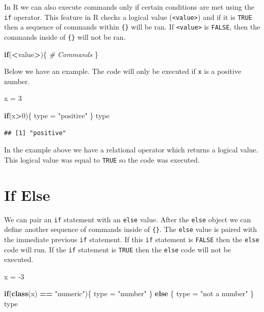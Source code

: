 \documentclass[
]{book}
\newenvironment{Shaded}{\begin{snugshade}}{\end{snugshade}}
\newcommand{\CommentTok}[1]{\textcolor[rgb]{0.56,0.35,0.01}{\textit{#1}}}
\newcommand{\ControlFlowTok}[1]{\textcolor[rgb]{0.13,0.29,0.53}{\textbf{#1}}}
\newcommand{\DecValTok}[1]{\textcolor[rgb]{0.00,0.00,0.81}{#1}}
\newcommand{\KeywordTok}[1]{\textcolor[rgb]{0.13,0.29,0.53}{\textbf{#1}}}
\newcommand{\NormalTok}[1]{#1}
\newcommand{\OperatorTok}[1]{\textcolor[rgb]{0.81,0.36,0.00}{\textbf{#1}}}
\newcommand{\StringTok}[1]{\textcolor[rgb]{0.31,0.60,0.02}{#1}}
\begin{document}
In R we can also execute commands only if certain conditions are met using the \texttt{if} operator. This feature in R checks a logical value (\texttt{\textless{}value\textgreater{}}) and if it is \texttt{TRUE} then a sequence of commands within \texttt{\{\}} will be ran. If \texttt{\textless{}value\textgreater{}} is \texttt{FALSE}, then the commands inside of \texttt{\{\}} will not be ran.

\begin{Shaded}
\begin{Highlighting}[]
\ControlFlowTok{if}\NormalTok{(}\OperatorTok{<}\NormalTok{value}\OperatorTok{>}\NormalTok{)\{}
  \CommentTok{# Commands }
\NormalTok{\}}
\end{Highlighting}
\end{Shaded}

Below we have an example. The code will only be executed if \texttt{x} is a positive number.

\begin{Shaded}
\begin{Highlighting}[]
\NormalTok{x =}\StringTok{ }\DecValTok{3}

\ControlFlowTok{if}\NormalTok{(x}\OperatorTok{>}\DecValTok{0}\NormalTok{)\{}
\NormalTok{  type =}\StringTok{ "positive"}
\NormalTok{\}}
\NormalTok{type }
\end{Highlighting}
\end{Shaded}

\begin{verbatim}
## [1] "positive"
\end{verbatim}

In the example above we have a relational operator which returns a logical value. This logical value was equal to \texttt{TRUE} so the code was executed.

\hypertarget{if-else}{%
\section{If Else}\label{if-else}}

We can pair an \texttt{if} statement with an \texttt{else} value. After the \texttt{else} object we can define another sequence of commands inside of \texttt{\{\}}. The \texttt{else} value is paired with the immediate previous \texttt{if} statement. If this \texttt{if} statement is \texttt{FALSE} then the \texttt{else} code will run. If the \texttt{if} statement is \texttt{TRUE} then the \texttt{else} code will not be executed.

\begin{Shaded}
\begin{Highlighting}[]
\NormalTok{x =}\StringTok{ }\DecValTok{-3}

\ControlFlowTok{if}\NormalTok{(}\KeywordTok{class}\NormalTok{(x) }\OperatorTok{==}\StringTok{ "numeric"}\NormalTok{)\{}
\NormalTok{  type =}\StringTok{ "number"}
\NormalTok{\} }\ControlFlowTok{else}\NormalTok{ \{}
\NormalTok{  type =}\StringTok{ "not a number"}
\NormalTok{\}}
\NormalTok{type}
\end{Highlighting}
\end{Shaded}
\end{document}

